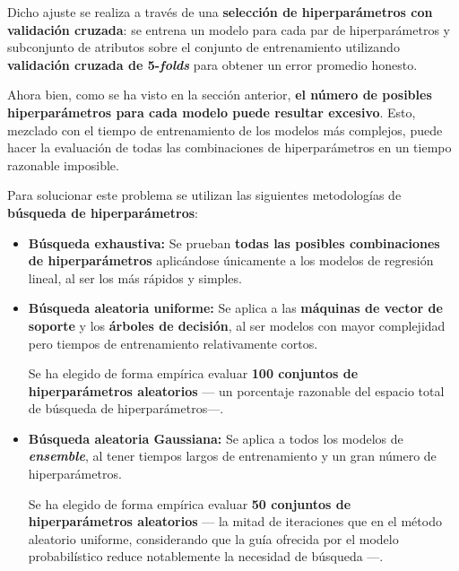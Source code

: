 Dicho ajuste se realiza a través de una \textbf{selección de hiperparámetros con validación cruzada}: se entrena un modelo para cada par de hiperparámetros y subconjunto de atributos sobre el conjunto de entrenamiento utilizando \textbf{validación cruzada de 5-\textit{folds}} para obtener un error promedio honesto. 

Ahora bien, como se ha visto en la sección anterior, \textbf{el número de posibles hiperparámetros para cada modelo puede resultar excesivo}. Esto, mezclado con el tiempo de entrenamiento de los modelos más complejos, puede hacer la evaluación de todas las combinaciones de hiperparámetros en un tiempo razonable imposible. 

Para solucionar este problema se utilizan las siguientes metodologías de \textbf{búsqueda de hiperparámetros}:
\begin{itemize}[parsep=2pt, itemsep=2pt, topsep=4pt]
	\item \textbf{Búsqueda exhaustiva:} Se prueban \textbf{todas las posibles combinaciones de hiperparámetros} aplicándose únicamente a los modelos de regresión lineal, al ser los más rápidos y simples.
	
	\item \textbf{Búsqueda aleatoria uniforme:} Se aplica a las \textbf{máquinas de vector de soporte} y los \textbf{árboles de decisión}, al ser modelos con mayor complejidad pero tiempos de entrenamiento relativamente cortos.
	
	Se ha elegido de forma empírica evaluar \textbf{100 conjuntos de hiperparámetros aleatorios} --- un porcentaje razonable del espacio total de búsqueda de hiperparámetros---.
	
	\item \textbf{Búsqueda aleatoria Gaussiana:} Se aplica a todos los modelos de \textbf{\textit{ensemble}}, al tener tiempos largos de entrenamiento y un gran número de hiperparámetros.
	
	Se ha elegido de forma empírica evaluar \textbf{50 conjuntos de hiperparámetros aleatorios} --- la mitad de iteraciones que en el método aleatorio uniforme, considerando que la guía ofrecida por el modelo probabilístico reduce notablemente la necesidad de búsqueda ---.
\end{itemize}

